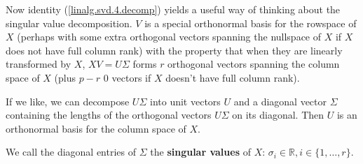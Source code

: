  
Now identity (\ref{linalg.svd.4.decomp}) yields a useful way of thinking about the singular value decomposition. \(V\) is a special orthonormal basis for the rowspace of \(X\) (perhaps with some extra orthogonal vectors spanning the nullspace of \(X\) if \(X\) does not have full column rank) with the property that when they are linearly transformed by \(X\), \(XV = U \Sigma\) forms \(r\) orthogonal vectors spanning the column space of \(X\) (plus \(p -r\) 0 vectors if \(X\) doesn't have full column rank). 

If we like, we can decompose \(U \Sigma\) into unit vectors \(U\) and a diagonal vector \(\Sigma\) containing the lengths of the orthogonal vectors \(U \Sigma\) on its diagonal. Then \(U\) is an orthonormal basis for the column space of \(X\).

We call the diagonal entries of \(\Sigma\) the \textbf{singular values} of \(X\): \(\sigma_i \in \mathbb{R}, i \in \{1, \ldots, r\}\). 

